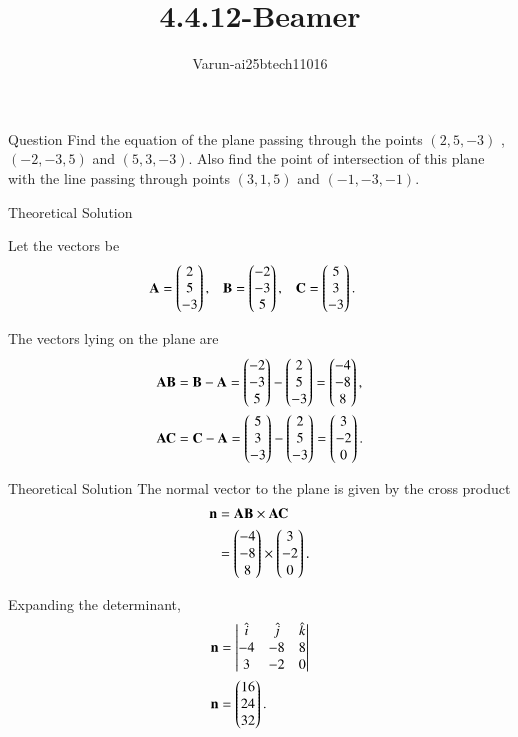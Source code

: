 \documentclass{beamer}
\title %
{4.4.12-Beamer}
\author %
{Varun-ai25btech11016}
\begin{document}
\frame{\titlepage}
\begin{frame}{Question}
Find the equation of the plane passing through the points $(2, 5, -3)$ , $(-2, -3, 5)$ and
$(5, 3, -3)$. Also find the point of intersection of this plane with the line passing
through points $(3, 1, 5)$ and $(-1, -3, -1)$.
\end{frame}



\begin{frame}{Theoretical Solution }

Let the vectors be
\begin{align}
\mathbf{A} &= \begin{pmatrix}2 \\ 5 \\ -3\end{pmatrix}, &
\mathbf{B} &= \begin{pmatrix}-2 \\ -3\\ 5\end{pmatrix}, &
\mathbf{C} &= \begin{pmatrix}5 \\ 3 \\ -3\end{pmatrix}.
\end{align}

The vectors lying on the plane are
\begin{align}
\mathbf{AB} &= \mathbf{B} - \mathbf{A} = \begin{pmatrix}-2 \\ -3 \\ 5\end{pmatrix} - \begin{pmatrix}2 \\ 5 \\ -3\end{pmatrix} 
= \begin{pmatrix}-4 \\ -8 \\ 8\end{pmatrix}, \\
\mathbf{AC} &= \mathbf{C} - \mathbf{A} = \begin{pmatrix}5 \\ 3 \\ -3\end{pmatrix} - \begin{pmatrix}2 \\ 5 \\ -3\end{pmatrix} 
= \begin{pmatrix}3 \\ -2 \\ 0\end{pmatrix}.
\end{align}
\end{frame}
\begin{frame}{Theoretical Solution }
The normal vector to the plane is given by the cross product
\begin{align}
\mathbf{n} &= \mathbf{AB} \times \mathbf{AC} \\
&= \begin{pmatrix}-4 \\ -8 \\ 8\end{pmatrix} \times \begin{pmatrix}3 \\ -2 \\ 0\end{pmatrix}\nonumber.
\end{align}

Expanding the determinant,
\begin{align}
\mathbf{n} &= \begin{vmatrix}
\hat{i} & \hat{j} & \hat{k} \\
-4 & -8 & 8 \\
3 & -2 & 0
\end{vmatrix} \\
\mathbf{n} &= \begin{pmatrix}16 \\ 24 \\ 32\end{pmatrix}.\nonumber
\end{align}
\end{frame}
\end{document}
